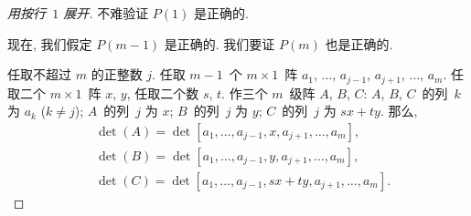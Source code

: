 \begin{proof}[用按行~\(1\) 展开]
    不难验证 \(P(1)\) 是正确的.

    现在, 我们假定 \(P(m-1)\) 是正确的.
    我们要证 \(P(m)\) 也是正确的.

    任取不超过 \(m\) 的正整数 \(j\).
    任取 \(m-1\)~个 \(m \times 1\)~阵
    \(a_1\), \(\dots\), \(a_{j-1}\),
    \(a_{j+1}\), \(\dots\), \(a_m\).
    任取二个 \(m \times 1\)~阵 \(x\), \(y\),
    任取二个数 \(s\), \(t\).
    作三个 \(m\)~级阵 \(A\), \(B\), \(C\):
    \(A\), \(B\), \(C\)~的列~\(k\) 为 \(a_k\) (\(k \neq j\));
    \(A\)~的列~\(j\) 为 \(x\);
    \(B\)~的列~\(j\) 为 \(y\);
    \(C\)~的列~\(j\) 为 \(sx + ty\).
    那么,
    \begin{align*}
         & \det {(A)}
        = \det
        {[a_1, \dots, a_{j-1}, x, a_{j+1}, \dots, a_m]},
        \\
         & \det {(B)}
        = \det
        {[a_1, \dots, a_{j-1}, y, a_{j+1}, \dots, a_m]},
        \\
         & \det {(C)}
        = \det
        {[a_1, \dots, a_{j-1}, sx + ty, a_{j+1}, \dots, a_m]}.
    \end{align*}


\end{proof}
